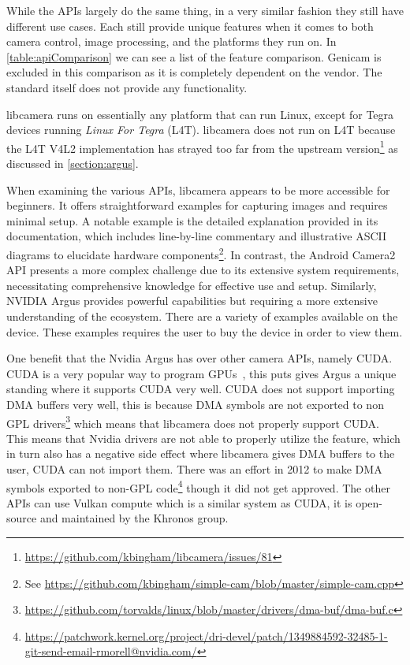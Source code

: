 While the APIs largely do the same thing, in a very similar fashion they still
have different use cases. Each still provide unique features when it comes to
both camera control, image processing, and the platforms they run on. In
\cref{table:apiComparison} we can see a list of the feature comparison. Genicam
is excluded in this comparison as it is completely dependent on the vendor. The
standard itself does not provide any functionality.

libcamera runs on essentially any platform that can run Linux, except for
Tegra devices running \textit{Linux For Tegra} (L4T). libcamera does not run
on L4T because the L4T V4L2 implementation has strayed too far from the
upstream version\footnote{\url{https://github.com/kbingham/libcamera/issues/81}} as
discussed in \cref{section:argus}.

When examining the various APIs, libcamera appears to be more accessible for
beginners. It offers straightforward examples for capturing images and requires
minimal setup. A notable example is the detailed explanation provided in its
documentation, which includes line-by-line commentary and illustrative ASCII
diagrams to elucidate hardware components\footnote{See \url{https://github.com/kbingham/simple-cam/blob/master/simple-cam.cpp}}.
In contrast, the Android Camera2 API presents a more complex challenge due to
its extensive system requirements, necessitating comprehensive knowledge for
effective use and setup. Similarly, NVIDIA Argus provides powerful capabilities but
requiring a more extensive understanding of the ecosystem. There are a variety
of examples available on the device. These examples requires the user to buy
the device in order to view them.

One benefit that the Nvidia Argus has over other camera APIs, namely CUDA.
CUDA is a very popular way to program GPUs~\cite{kalaiselvi2017survey}, this
puts gives Argus a unique standing where it supports CUDA very well. CUDA does
not support importing DMA buffers very well, this is because DMA symbols are
not exported to non GPL drivers\footnote{\url{https://github.com/torvalds/linux/blob/master/drivers/dma-buf/dma-buf.c}}
which means that libcamera does not properly support CUDA. This means that
Nvidia drivers are not able to properly utilize the feature, which in turn also
has a negative side effect where libcamera gives DMA buffers to the user, CUDA
can not import them. There was an effort in 2012 to make DMA symbols exported
to non-GPL code\footnote{\url{https://patchwork.kernel.org/project/dri-devel/patch/1349884592-32485-1-git-send-email-rmorell@nvidia.com/}} though it did not get approved. The other APIs can use Vulkan compute
which is a similar system as CUDA, it is open-source and maintained by the
Khronos group.

